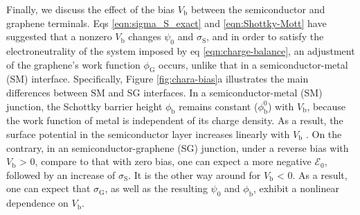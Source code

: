 \documentclass[journal=nalefd]{achemso}
\newcommand*\subs[1]{_{\text{#1}}} %
\begin{document}
Finally, we discuss the effect of the bias $V\subs{b}$ between the semiconductor and graphene terminals.
Eqs \ref{eqn:sigma_S_exact} and \ref{eqn:Shottky-Mott}  have suggested that a nonzero $V\subs{b}$ changes $\psi_0$ and $\sigma\subs{S}$, and in order to satisfy the electroneutrality of the system imposed by eq \ref{eqn:charge-balance}, an adjustment of the graphene's work function $\phi\subs{G}$ occurs, unlike that in a semiconductor-metal (SM) interface. 
Specifically, Figure \ref{fig:chara-bias}a illustrates the main differences between SM and SG interfaces. 
In a semiconductor-metal (SM) junction, the Schottky barrier height $\phi\subs{b}$ remains constant ($\phi\subs{b}^0$) with $V\subs{b}$, because the work function of metal is independent of its charge density. 
As a result, the surface potential in the semiconductor layer increases linearly with $V\subs{b}$ \cite{Sze2006Mosfets}.
On the contrary, in an semiconductor-graphene (SG) junction, under a reverse bias with $V\subs{b}$ > 0, compare to that with zero bias, one can expect a more negative $\mathscr{E}_0$, followed by an increase of $\sigma\subs{S}$.
It is the other way around for $V\subs{b}$ < 0. As a result, one can expect that $\sigma\subs{G}$, as well as the resulting $\psi_0$ and $\phi\subs{b}$, exhibit a nonlinear dependence on $V\subs{b}$. 
\end{document}
